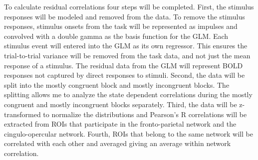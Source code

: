 \documentclass[phd,appendix,figures]{uithesis}
\begin{document}
To calculate residual correlations four steps will be completed.
First, the stimulus responses will be modeled and removed from the data.
To remove the stimulus responses, stimulus onsets from the task will be represented as impulses and convolved with a double gamma as the basis function for the GLM. 
Each stimulus event will entered into the GLM as its own regressor.
This ensures the trial-to-trial variance will be removed from the task data, and not just the mean response of a stimulus. 
The residual data from the GLM will represent BOLD responses not captured by direct responses to stimuli. 
Second, the data will be split into the mostly congruent block and mostly incongruent blocks.
The splitting allows me to analyze the state dependent correlations during the mostly congruent and mostly incongruent blocks separately.
Third, the data will be z-transformed to normalize the distributions and Pearson's R correlations will be extracted from ROIs that participate in the fronto-parietal network and the cingulo-opercular network.
Fourth, ROIs that belong to the same network will be correlated with each other and averaged giving an average within network correlation.
\end{document}
